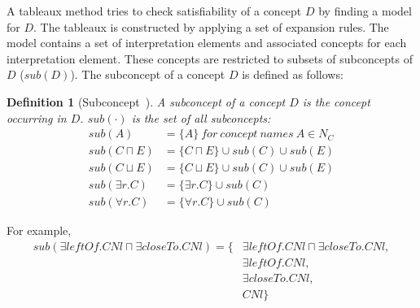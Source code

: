 \documentclass{article}
\newtheorem{mydef}{Definition}
\begin{document}
A tableaux method tries to check satisfiability of a concept $D$ by finding a model for $D$. The tableaux is constructed by applying a set of expansion rules. The model contains a set of 
interpretation elements and associated concepts for each interpretation element. These concepts are restricted to subsets of subconcepts of $D$ ($sub(D)$). The subconcept of a concept $D$ is defined as
follows:
\begin{mydef}[Subconcept~\cite{horrocks1999description}]
 A subconcept of a concept $D$ is the concept occurring in $D$. $sub(\cdot)$ is the set of all subconcepts:
 \begin{align*}
 sub(A)&=\{A\}~for~concept~names~A\in N_C\\
 sub(C\sqcap E)&=\{C\sqcap E\}\cup sub(C)\cup sub(E)\\
 sub(C\sqcup E)&=\{C\sqcup E\}\cup sub(C)\cup sub(E)\\
 sub(\exists r.C)&=\{\exists r.C\}\cup sub(C)\\
 sub(\forall r.C)&=\{\forall r.C\}\cup sub(C)
 \end{align*}
\end{mydef}

For example, 
 \begin{align*}
 sub(\exists leftOf.CNl \sqcap \exists closeTo.CNl)=\{&\exists leftOf.CNl \sqcap \exists closeTo.CNl,\\
 &\exists leftOf.CNl,\\
 &\exists closeTo.CNl,\\
 &CNl\}
 \end{align*}
 
\end{document}
